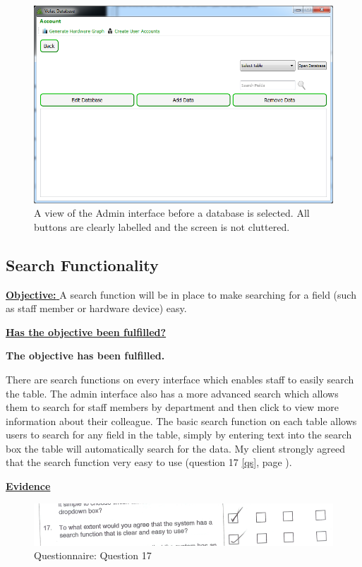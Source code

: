 \begin{figure}[H]
    \includegraphics[width=\textwidth]{./Evaluation/Images/clearlabels.png}
    \caption{A view of the Admin interface before a database is selected. All buttons are clearly labelled and the screen is not cluttered.} 
\end{figure}


\subsection{Search Functionality}\label{search}

\underline{\textbf{Objective:} }  A search function will be in place to make searching for a field (such as staff member or hardware device) easy.

\underline{\textbf{Has the objective been fulfilled?}}

\textbf{The objective has been fulfilled.}

There are search functions on every interface which enables staff to easily search the table. The admin interface also has a more advanced search which allows them to search for staff members by department and then click to view more information about their colleague. The basic search function on each table allows users to search for any field in the table, simply by entering text into the search box the table will automatically search for the data. My client strongly agreed that the search function very easy to use (question 17 \ref{qs}, page \pageref{qs}).

\underline{\textbf{Evidence}}

\begin{figure}[H]
    \includegraphics[width=\textwidth]{./Evaluation/EvaluationQuestionnaire/17.png}
    \caption{Questionnaire: Question 17} 
\end{figure}

